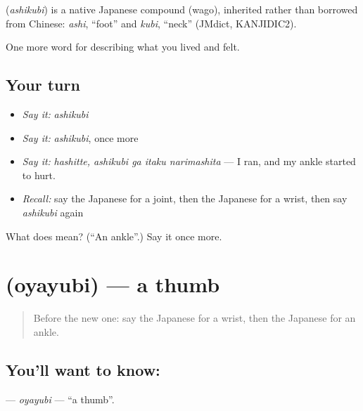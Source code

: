 \begin{cousinweb}
\textbf{} (\emph{ashikubi}) is a native Japanese compound (wago), inherited rather than borrowed from Chinese: \emph{ashi}, \textquotedblleft{}foot\textquotedblright{} and \emph{kubi}, \textquotedblleft{}neck\textquotedblright{} (JMdict, KANJIDIC2).
\end{cousinweb}

\begin{grammarlens}[title={What you've built}]
One more word for describing what you lived and felt.
\end{grammarlens}

\subsection*{Your turn}
\begin{itemize}
\raggedright
  \item \emph{Say it:} \emph{ashikubi}
  \item \emph{Say it:} \emph{ashikubi}, once more
  \item \emph{Say it:} \emph{hashitte, ashikubi ga itaku narimashita} — I ran, and my ankle started to hurt.
  \item \emph{Recall:} say the Japanese for a joint, then the Japanese for a wrist, then say \emph{ashikubi} again
\end{itemize}

\begin{tcolorbox}[breakable,colback=teal!4,colframe=teal!35!black,title={Before you move on}]
What does  mean? (\textquotedblleft{}An ankle\textquotedblright{}.) Say it once more.
\end{tcolorbox}
\section[\texorpdfstring{\ja{おやゆび} (oyayubi)}{おやゆび (oyayubi)}]{ (oyayubi) — a thumb}

\label{lesson:JA-C443-oyayubi}



\begin{quote}
Before the new one: say the Japanese for a wrist, then the Japanese for an ankle.
\end{quote}

\subsection*{You'll want to know: }
\textbf{} — \emph{oyayubi} — \textquotedblleft{}a thumb\textquotedblright{}.

